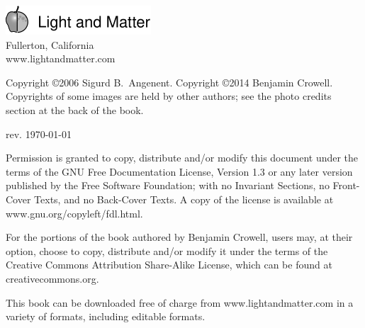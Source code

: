 \thispagestyle{empty}

\vspace{100mm}

\noindent
\includegraphics{cover/lmlogo}\\
Fullerton, California\\
www.lightandmatter.com

\vspace{20mm}
\noindent
Copyright \copyright 2006 Sigurd B.~Angenent.
Copyright \copyright  2014 Benjamin Crowell.
Copyrights of some images are held by other authors; see the photo credits section
at the back of the book.

\vspace{20mm}
\noindent
rev. \today{}

\vspace{6mm}
\noindent
Permission is granted to copy, distribute and/or
modify this document under the terms of the GNU Free Documentation License, Version
1.3 or any later version published by the Free Software Foundation; with no Invariant
Sections, no Front-Cover Texts, and no Back-Cover Texts. A copy of the license is
available at www.gnu.org/copyleft/fdl.html.

For the portions of the book authored by Benjamin Crowell, users may, at their option,
choose to copy, distribute and/or modify it
under the terms of the Creative Commons Attribution
Share-Alike License, which can be found at creativecommons.org.

This book can be downloaded free of charge
from www.lightandmatter.com in a variety of formats,
including editable formats.
